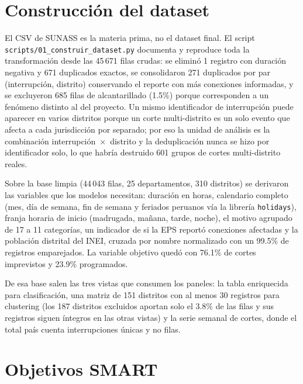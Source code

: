 \documentclass[11pt,a4paper]{article}
\begin{document}
\section{Construcción del dataset}

El CSV de SUNASS es la materia prima, no el dataset final. El script
\texttt{scripts/01\_construir\_dataset.py} documenta y reproduce toda la
transformación desde las 45\,671 filas crudas: se eliminó 1 registro con duración
negativa y 671 duplicados exactos, se consolidaron 271 duplicados por par
(interrupción, distrito) conservando el reporte con más conexiones informadas, y
se excluyeron 685 filas de alcantarillado (1.5\%) porque corresponden a un
fenómeno distinto al del proyecto. Un mismo identificador de interrupción puede
aparecer en varios distritos porque un corte multi-distrito es un solo evento que
afecta a cada jurisdicción por separado; por eso la unidad de análisis es la
combinación interrupción~$\times$~distrito y la deduplicación nunca se hizo por
identificador solo, lo que habría destruido 601 grupos de cortes multi-distrito
reales.

Sobre la base limpia (44\,043 filas, 25 departamentos, 310 distritos) se
derivaron las variables que los modelos necesitan: duración en horas, calendario
completo (mes, día de semana, fin de semana y feriados peruanos vía la librería
\texttt{holidays}), franja horaria de inicio (madrugada, mañana, tarde, noche),
el motivo agrupado de 17 a 11 categorías, un indicador de si la EPS reportó
conexiones afectadas y la población distrital del INEI, cruzada por nombre
normalizado con un 99.5\% de registros emparejados. La variable objetivo quedó
con 76.1\% de cortes imprevistos y 23.9\% programados.

De esa base salen las tres vistas que consumen los paneles: la tabla enriquecida
para clasificación, una matriz de 151 distritos con al menos 30 registros para
clustering (los 187 distritos excluidos aportan solo el 3.8\% de las filas y
sus registros siguen íntegros en las otras vistas) y la serie semanal de cortes,
donde el total país cuenta interrupciones únicas y no filas.

\section{Objetivos SMART}
\end{document}
